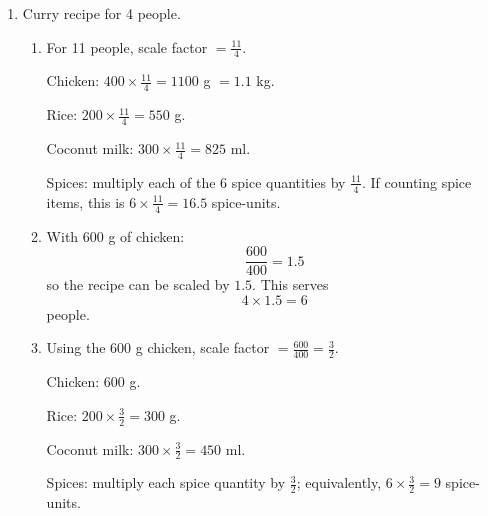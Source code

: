 \documentclass[12pt,a4paper]{article}
\begin{document}
\begin{enumerate}
\textbf{Solution.} Total parts \(=2+1+8=11\).
\[
\text{one part}=\frac{3.3}{11}=0.3\text{ litres}.
\]
\[
\text{lemon juice}=2\times0.3=0.6\text{ L},\quad
\text{sugar}=1\times0.3=0.3\text{ L},\quad
\text{water}=8\times0.3=2.4\text{ L}.
\]

\item Curry recipe for 4 people.

\begin{enumerate}[label=(\alph*)]
\item For 11 people, scale factor \(=\frac{11}{4}\).

Chicken: \(400\times\frac{11}{4}=1100\) g \(=1.1\) kg.

Rice: \(200\times\frac{11}{4}=550\) g.

Coconut milk: \(300\times\frac{11}{4}=825\) ml.

Spices: multiply each of the 6 spice quantities by \(\frac{11}{4}\). If counting spice items, this is \(6\times\frac{11}{4}=16.5\) spice-units.

\item With 600 g of chicken:
\[
\frac{600}{400}=1.5
\]
so the recipe can be scaled by \(1.5\). This serves
\[
4\times1.5=6
\]
people.

\item Using the 600 g chicken, scale factor \(=\frac{600}{400}=\frac32\).

Chicken: \(600\) g.

Rice: \(200\times\frac32=300\) g.

Coconut milk: \(300\times\frac32=450\) ml.

Spices: multiply each spice quantity by \(\frac32\); equivalently, \(6\times\frac32=9\) spice-units.
\end{enumerate}
\end{enumerate}
\end{document}

